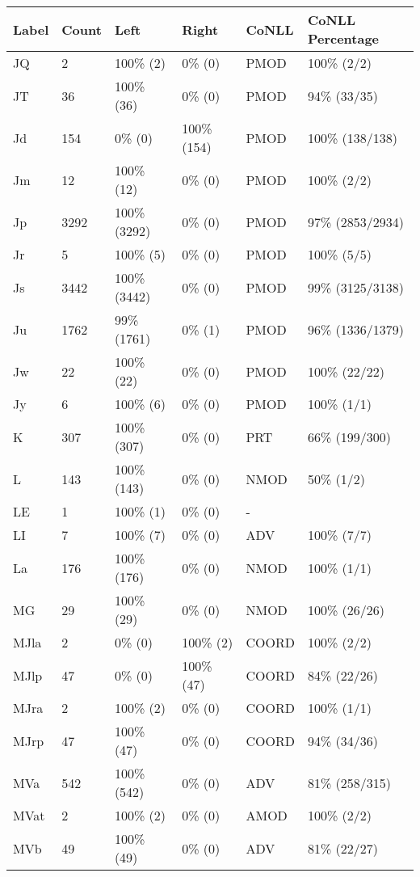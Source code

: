 \begin{figure*}
\begin{tabular}{|l|l|l|l||l|l|}
\hline
Label & Count & Left & Right & CoNLL & CoNLL Percentage\\ 
\hline
 JQ & 2 & 100\% (2) & 0\% (0) & PMOD & 100\% (2/2) \\ 
\hline
 JT & 36 & 100\% (36) & 0\% (0) & PMOD & 94\% (33/35) \\ 
\hline
 Jd & 154 & 0\% (0) & 100\% (154) & PMOD & 100\% (138/138) \\ 
\hline
 Jm & 12 & 100\% (12) & 0\% (0) & PMOD & 100\% (2/2) \\ 
\hline
 Jp & 3292 & 100\% (3292) & 0\% (0) & PMOD & 97\% (2853/2934) \\ 
\hline
 Jr & 5 & 100\% (5) & 0\% (0) & PMOD & 100\% (5/5) \\ 
\hline
 Js & 3442 & 100\% (3442) & 0\% (0) & PMOD & 99\% (3125/3138) \\ 
\hline
 Ju & 1762 & 99\% (1761) & 0\% (1) & PMOD & 96\% (1336/1379) \\ 
\hline
 Jw & 22 & 100\% (22) & 0\% (0) & PMOD & 100\% (22/22) \\ 
\hline
 Jy & 6 & 100\% (6) & 0\% (0) & PMOD & 100\% (1/1) \\ 
\hline
 K & 307 & 100\% (307) & 0\% (0) & PRT & 66\% (199/300) \\ 
\hline
 L & 143 & 100\% (143) & 0\% (0) & NMOD & 50\% (1/2) \\ 
\hline
 LE & 1 & 100\% (1) & 0\% (0) & - &  \\ 
\hline
 LI & 7 & 100\% (7) & 0\% (0) & ADV & 100\% (7/7) \\ 
\hline
 La & 176 & 100\% (176) & 0\% (0) & NMOD & 100\% (1/1) \\ 
\hline
 MG & 29 & 100\% (29) & 0\% (0) & NMOD & 100\% (26/26) \\ 
\hline
 MJla & 2 & 0\% (0) & 100\% (2) & COORD & 100\% (2/2) \\ 
\hline
 MJlp & 47 & 0\% (0) & 100\% (47) & COORD & 84\% (22/26) \\ 
\hline
 MJra & 2 & 100\% (2) & 0\% (0) & COORD & 100\% (1/1) \\ 
\hline
 MJrp & 47 & 100\% (47) & 0\% (0) & COORD & 94\% (34/36) \\ 
\hline
 MVa & 542 & 100\% (542) & 0\% (0) & ADV & 81\% (258/315) \\ 
\hline
 MVat & 2 & 100\% (2) & 0\% (0) & AMOD & 100\% (2/2) \\ 
\hline
 MVb & 49 & 100\% (49) & 0\% (0) & ADV & 81\% (22/27) \\ 

\end{tabular}
\end{figure*}
